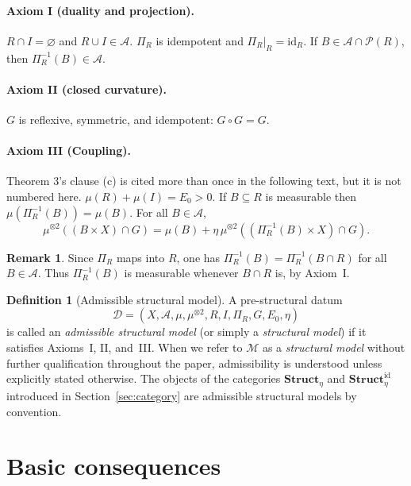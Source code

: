 \documentclass[11pt]{article}
\numberwithin{equation}{section}
\theoremstyle{definition}
\newtheorem{definition}[theorem]{Definition}
\newtheorem{remark}[theorem]{Remark}
\begin{document}
\paragraph{Axiom I (duality and projection).}
$R\cap I=\varnothing$ and $R\cup I\in\mathcal A$.
$\Pi_R$ is idempotent and $\Pi_R|_R=\mathrm{id}_R$.
If $B\in\mathcal A\cap\mathcal P(R)$, then $\Pi_R^{-1}(B)\in\mathcal A$.

\paragraph{Axiom II (closed curvature).}
$G$ is reflexive, symmetric, and idempotent: $G\circ G=G$.

\paragraph{Axiom III (Coupling).}
\begin{structuralreview}[2]{Theorem 3's clause (c) is cited more than once in the following text, but it is not numbered here.}
$\mu(R)+\mu(I)=E_0>0$.
If $B\subseteq R$ is measurable then $\mu(\Pi_R^{-1}(B))=\mu(B)$.
For all $B\in\mathcal A$,
\[
\mu^{\otimes2}((B\times X)\cap G)
= \mu(B)+\eta\,\mu^{\otimes2}((\Pi_R^{-1}(B)\times X)\cap G).
\]
\end{structuralreview}
\begin{remark}\label{rem:preimage}
Since $\Pi_R$ maps into $R$, one has $\Pi_R^{-1}(B)=\Pi_R^{-1}(B\cap R)$ for all $B\in\mathcal A$.
Thus $\Pi_R^{-1}(B)$ is measurable whenever $B\cap R$ is, by Axiom~I.
\end{remark}

\begin{definition}[Admissible structural model]\label{def:admissible}
A pre-structural datum
\[
\mathcal D=(X,\mathcal A,\mu,\mu^{\otimes2},R,I,\Pi_R,G,E_0,\eta)
\]
is called an \emph{admissible structural model} (or simply a \emph{structural model}) if it satisfies Axioms~I, II, and~III. When we refer to $\mathcal M$ as a \emph{structural model} without further qualification throughout the paper, admissibility is understood unless explicitly stated otherwise. The objects of the categories $\mathbf{Struct}_\eta$ and $\mathbf{Struct}^{\mathrm{id}}_\eta$ introduced in Section~\ref{sec:category} are admissible structural models by convention.
\end{definition}


\section{Basic consequences}
\end{document}
